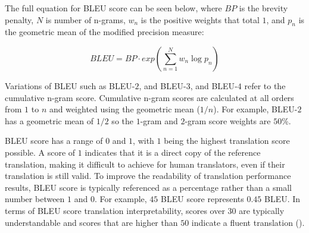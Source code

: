 The full equation for BLEU score can be seen below, where $BP$ is the brevity penalty, $N$ is number of n-grams, $w_n$ is the positive weights that total $1$, and $p_n$ is the geometric mean of the modified precision measure:

\begin{equation}
    BLEU = BP \cdot exp\left (  \sum_{n=1}^{N} w_{n} \log  p_{n}\right )
\end{equation}


Variations of BLEU such as \acrshort{BLEU}-$2$, and \acrshort{BLEU}-$3$, and \acrshort{BLEU}-$4$ refer to the cumulative n-gram score. Cumulative n-gram scores are calculated at all orders from $1$ to $n$ and weighted using the geometric mean ($1/n$). For example, \acrshort{BLEU}-$2$ has a geometric mean of $1/2$ so the $1$-gram and $2$-gram score weights are $50$\%.















\acrshort{BLEU} score has a range of $0$ and $1$, with $1$ being the highest translation score possible. A score of $1$ indicates that it is a direct copy of the reference translation, making it difficult to achieve for human translators, even if their translation is still valid. To improve the readability of translation performance results, \acrshort{BLEU} score is typically referenced as a percentage rather than a small number between $1$ and $0$. For example, $45$ \acrshort{BLEU} score represents $0.45$ \acrshort{BLEU}. In terms of \acrshort{BLEU} score translation interpretability, scores over $30$ are typically understandable and scores that are higher than $50$ indicate a fluent translation (\cite{lavie_evaluating_2010}).

